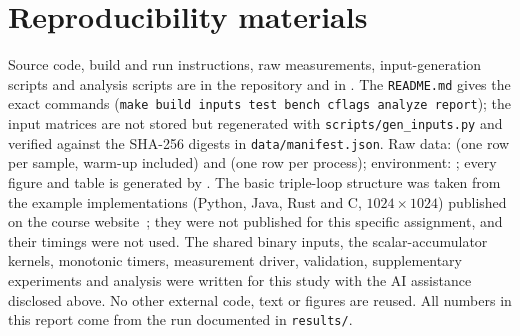 \section{Reproducibility materials}
\label{sec:materials}
Source code, build and run instructions, raw measurements, input-generation scripts and analysis scripts are in the repository
\repourl{} and in . The \texttt{README.md} gives the exact commands
(\texttt{make build inputs test bench cflags analyze report}); the input matrices are not stored but regenerated with
\texttt{scripts/gen\_inputs.py} and verified against the SHA-256 digests in \texttt{data/manifest.json}. Raw data:
 (one row per sample, warm-up included) and  (one row per process);
environment: ; every figure and table is generated by .
The basic triple-loop structure was taken from the example implementations (Python, Java, Rust and C, $1024\times1024$) published on the course website~\cite{course}; they were not published for this specific
assignment, and their timings were not used. The shared binary inputs, the scalar-accumulator kernels, monotonic timers, measurement driver, validation, supplementary experiments and analysis were
written for this study with the AI assistance disclosed above. No other external code, text or figures are reused. All numbers in this report come from the run documented in
\texttt{results/}.

